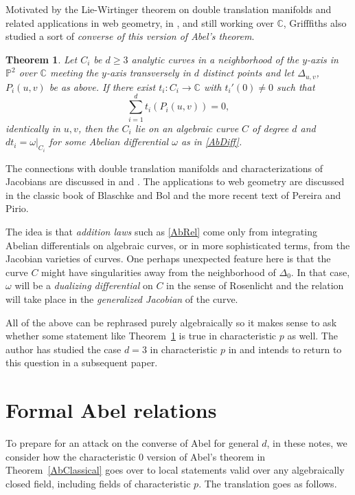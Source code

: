 \documentclass[12pt]{amsart}
\theoremstyle{theorem}
\newtheorem{thm}{Theorem}
\newcommand{\PP}{\mathbb{P}}
\newcommand{\CC}{\mathbb{C} }
\begin{document}
Motivated by the Lie-Wirtinger theorem on double translation manifolds and related applications in web geometry, 
in \cite{Grif}, and still working over $\CC$, Grifffiths also studied a sort of \emph{converse of this version of Abel's theorem}.

\begin{thm} 
\label{AbConv}
 Let $C_i$ be $d \ge 3$ analytic curves in a neighborhood of the $y$-axis in $\PP^2$ over $\CC$ meeting the $y$-axis
transversely in $d$ distinct points and let $\Delta_{u,v}$, $P_i(u,v)$ be as above.  If there exist $t_i : C_i \to \CC$ with $t_i'(0) \ne 0$
such that 
\begin{equation}
\label{AbRel}
\sum_{i=1}^d t_i(P_i(u,v)) = 0,
\end{equation}
identically in $u,v$, then the $C_i$ lie on an algebraic curve $C$ of degree $d$ and $dt_i = \omega|_{C_i}$ for some Abelian differential $\omega$ as in 
\eqref{AbDiff}.  
\end{thm}

The connections with double translation manifolds and characterizations of Jacobians are discussed in \cite{M} and \cite{Lit1}. 
The applications to web geometry are discussed in the classic book \cite{BB} of Blaschke and Bol and the more 
recent text \cite{PP} of Pereira and Pirio.

The idea is that \emph{addition laws} such as \eqref{AbRel} come only from integrating Abelian differentials on 
algebraic curves, or in more sophisticated terms, from the Jacobian varieties of curves.  One perhaps unexpected
feature here is that the curve $C$ might have singularities away from the neighborhood of $\Delta_0$.  In that 
case, $\omega$ will be a \emph{dualizing differential} on $C$ in the sense of Rosenlicht and the relation
will take place in the \emph{generalized Jacobian} of the curve.

All of the above can be rephrased purely algebraically so it makes sense to ask whether some statement like
Theorem~\ref{AbConv} is true in characteristic $p$ as well.   The author has studied the case $d = 3$ in characteristic
$p$ in \cite{Lit} and intends to return to this question in a subsequent paper.

\section{Formal Abel relations}

To prepare for an attack on the converse of Abel for general $d$,  in these notes,
we consider how the characteristic $0$ version of Abel's theorem in Theorem~\ref{AbClassical} goes over to local statements
valid over any algebraically closed field, including fields of characteristic $p$.  The translation goes as follows.  
\end{document}

